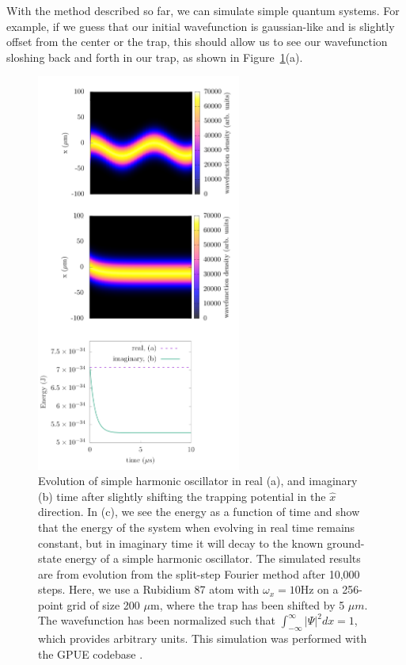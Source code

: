 With the method described so far, we can simulate simple quantum systems.
For example, if we guess that our initial wavefunction is gaussian-like and is slightly offset from the center or the trap, this should allow us to see our wavefunction sloshing back and forth in our trap, as shown in Figure~\ref{fig:evolve}(a).

\begin{figure}

\center \includegraphics[width=0.6\textwidth]{data/splitop/SHO/SHO_gimp.pdf}

\caption{Evolution of simple harmonic oscillator in real (a), and imaginary (b) time after slightly shifting the trapping potential in the $\hat x$ direction.
In (c), we see the energy as a function of time and show that the energy of the system when evolving in real time remains constant, but in imaginary time it will decay to the known ground-state energy of a simple harmonic oscillator.
The simulated results are from evolution from the split-step Fourier method after 10,000 steps.
Here, we use a Rubidium 87 atom with $\omega_x = 10$Hz on a 256-point grid of size 200 $\mu$m, where the trap has been shifted by 5 $\mu m$.
The wavefunction has been normalized such that $\int_{-\infty}^\infty|\Psi|^2 dx = 1$, which provides arbitrary units.
This simulation was performed with the GPUE codebase \cite{schloss2018}.
}
\label{fig:evolve}
\end{figure}


